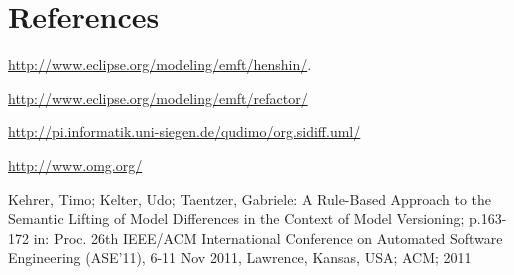 \documentclass[a4paper,DIV=10]{scrartcl}
\begin{document}
\newpage
\section{References}
\begin{thebibliography}{WW}

 \href{http://www.eclipse.org/modeling/emft/henshin/} {http://www.eclipse.org/modeling/emft/henshin/}.
 
 \href{http://www.eclipse.org/modeling/emft/refactor/} {http://www.eclipse.org/modeling/emft/refactor/}

 \href{http://pi.informatik.uni-siegen.de/qudimo/org.sidiff.uml/} {http://pi.informatik.uni-siegen.de/qudimo/org.sidiff.uml/}

 \href{http://www.omg.org/} {http://www.omg.org/}

 Kehrer, Timo; Kelter, Udo; Taentzer,
Gabriele: A Rule-Based Approach to the Semantic Lifting of
Model Differences in the Context of Model Versioning;
p.163-172 in: Proc. 26th IEEE/ACM International Conference
on Automated Software Engineering (ASE'11), 6-11 Nov 2011,
Lawrence, Kansas, USA; ACM; 2011

\end{thebibliography}
\end{document}
